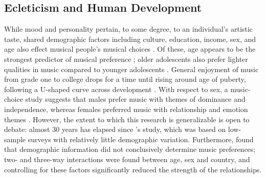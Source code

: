 \documentclass[a4paper]{article}
\begin{document}
\subsection{Ecleticism and Human Development}\label{sec:hdi}
While mood and personality pertain, to some degree, to an individual's artistic taste, shared demographic factors including culture, education, income, sex, and age also effect musical people's musical choices \cite{peterson1996changing,christenson1988genre,roberts1990music,leblanc1999effect,schafer2009functions,north2013musical}. Of these, age appears to be the strongest predictor of musical preference \cite{christenson1988genre}; older adolescents also prefer lighter qualities in music compared to younger adolescents \cite{roberts1990music}. General enjoyment of music from grade one to college drops for a time until rising around age of puberty, following a U-shaped curve across development \cite{leblanc1996music}. With respect to sex, a music-choice study suggests that males prefer music with themes of dominance and independence, whereas females preferred music with relationship and emotion themes \cite{christenson1988genre}. However, the extent to which this research is generalizable is open to debate: almost 30 years has elapsed since \cite{christenson1988genre}'s study, which was based on low-sample surveys with relatively little demographic variation. Furthermore, \cite{leblanc1999effect,north2013musical} found that demographic information did not conclusively determine music preferences; two- and three-way interactions were found between age, sex and country, and controlling for these factors significantly reduced the strength of the relationships. 
\end{document}
